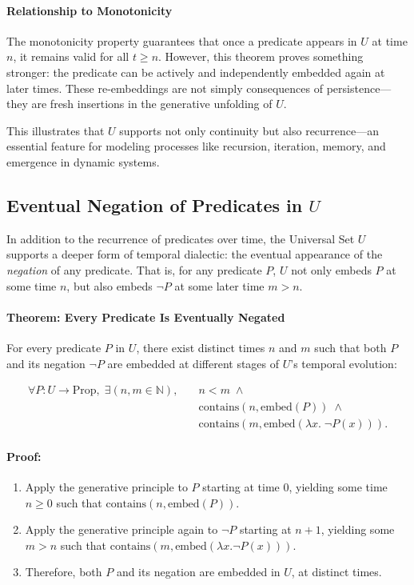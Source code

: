 \documentclass[12pt]{article}
\begin{document}
\paragraph{Relationship to Monotonicity}
The monotonicity property guarantees that once a predicate appears in \( U \) at time \( n \), it remains valid for all \( t \geq n \). However, this theorem proves something stronger: the predicate can be actively and independently embedded again at later times. These re-embeddings are not simply consequences of persistence—they are fresh insertions in the generative unfolding of \( U \).

This illustrates that \( U \) supports not only continuity but also recurrence—an essential feature for modeling processes like recursion, iteration, memory, and emergence in dynamic systems.


\subsection{Eventual Negation of Predicates in \( U \)}

In addition to the recurrence of predicates over time, the Universal Set \( U \) supports a deeper form of temporal dialectic: the eventual appearance of the \textit{negation} of any predicate. That is, for any predicate \( P \), \( U \) not only embeds \( P \) at some time \( n \), but also embeds \( \neg P \) at some later time \( m > n \).

\paragraph{Theorem: Every Predicate Is Eventually Negated}
For every predicate \( P \) in \( U \), there exist distinct times \( n \) and \( m \) such that both \( P \) and its negation \( \neg P \) are embedded at different stages of \( U \)'s temporal evolution:

\begin{align}
    \forall P: U \to \text{Prop},\; \exists (n, m \in \mathbb{N}),\quad 
    & n < m \;\wedge \nonumber \\
    & \text{contains}(n, \text{embed}(P)) \;\wedge \nonumber \\
    & \text{contains}(m, \text{embed}(\lambda x.\; \neg P(x))).
\end{align}

\paragraph{Proof:}
\begin{enumerate}
    \item Apply the generative principle to \( P \) starting at time \( 0 \), yielding some time \( n \geq 0 \) such that \( \text{contains}(n, \text{embed}(P)) \).
    \item Apply the generative principle again to \( \neg P \) starting at \( n + 1 \), yielding some \( m > n \) such that \( \text{contains}(m, \text{embed}(\lambda x. \neg P(x))) \).
    \item Therefore, both \( P \) and its negation are embedded in \( U \), at distinct times.
\end{enumerate}
\end{document}
